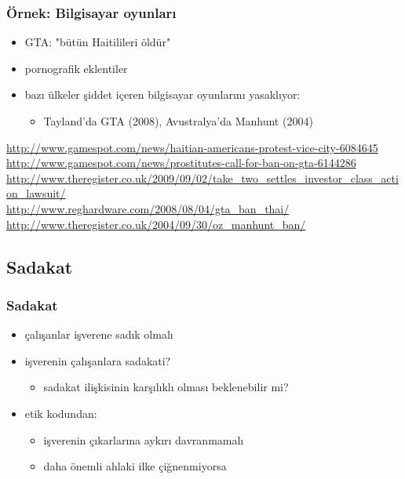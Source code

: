 \documentclass[dvipsnames]{beamer}
\theoremstyle{definition}
\theoremstyle{example}
\theoremstyle{plain}
\begin{document}
\begin{frame}
  \frametitle{Örnek: Bilgisayar oyunları}

  \begin{itemize}
    \item GTA: "bütün Haitilileri öldür"
    \item pornografik eklentiler

    \bigskip
    \item bazı ülkeler şiddet içeren bilgisayar oyunlarını yasaklıyor:
    \begin{itemize}
      \item Tayland'da GTA (2008), Avustralya'da Manhunt (2004)
    \end{itemize}
  \end{itemize}

  \medskip
  \tiny{\url{http://www.gamespot.com/news/haitian-americans-protest-vice-city-6084645}}\\
  \tiny{\url{http://www.gamespot.com/news/prostitutes-call-for-ban-on-gta-6144286}}\\
  \tiny{\url{http://www.theregister.co.uk/2009/09/02/take_two_settles_investor_class_action_lawsuit/}}\\
  \tiny{\url{http://www.reghardware.com/2008/08/04/gta_ban_thai/}}\\
  \tiny{\url{http://www.theregister.co.uk/2004/09/30/oz_manhunt_ban/}}\\
\end{frame}

\subsection{Sadakat}

\begin{frame}
  \frametitle{Sadakat}

  \begin{itemize}
    \item çalışanlar işverene sadık olmalı

    \medskip
    \item işverenin çalışanlara sadakati?
    \begin{itemize}
      \item sadakat ilişkisinin karşılıklı olması beklenebilir mi?
    \end{itemize}

    \pause
    \medskip
    \item etik kodundan:
    \begin{itemize}
      \item işverenin çıkarlarına aykırı davranmamalı
      \item daha önemli ahlaki ilke çiğnenmiyorsa
    \end{itemize}
  \end{itemize}
\end{frame}
\end{document}

